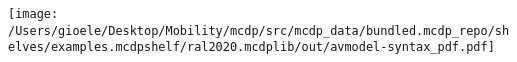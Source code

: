 
    \texttt{[image: /Users/gioele/Desktop/Mobility/mcdp/src/mcdp\_data/bundled.mcdp\_repo/shelves/examples.mcdpshelf/ral2020.mcdplib/out/avmodel-syntax\_pdf.pdf]}
    